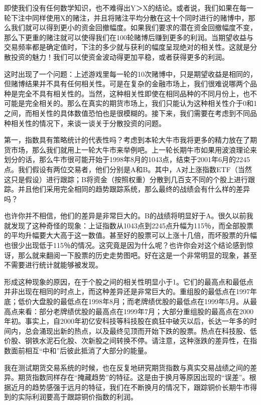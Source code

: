 即使我们没有任何数学知识，也不难得出Y＞X的结论。或者说，我们如果在每一轮下注中同样使用X的赌注，并且将赌注平均分散在这十个同时进行的赌博中，那么我们就可以得到更小的资金回撤幅度。如果我们要求的潜在资金回撤幅度不变，那么下更重的赌注就可以使得我们在100轮赌博后赚到更多的利润。当期望收益与交易频率都是确定值时，下注的多少就与获利的幅度呈现绝对的相关性。这就是分散投资的魅力！我们可以使资金波动得更加平稳，或者获得更多的利润。

这时出现了一个问题：上述游戏里每一轮的10次赌博中，只是期望收益是相同的，但赌博结果并不具有任何相关性。可是在复杂的金融市场上，我们很难说哪两个品种是完全不具有相关性的。当然，这种相关性即使在相同品种的不同月份上，也不可能是完全相关的。那么在真实的期货市场上，我们只能认为这种相关性介于0和1之间，而相关性的具体数值恐怕也是很模糊的。接下来，我们需要在考虑到不同品种相关性的情况下，来谈一谈关于分散投资的问题。

第一，指数具有策略统计的代表性吗？考虑到本轮大牛市我将更多的精力放在了期货市场，那么我们就用上一轮大牛市来举例吧。上一轮长期牛市如果用波浪理论来划分的话，那么牛市很可能开始于1998年8月的1043点，结束于2001年6月的2245点。我们假设有两位交易者，他们分别是A和B。其中，A对上涨指数ETF（当然这只是假设）进行跟踪；B将资金（按照权重）分散到几百支不同的个股上进行跟踪。并且他们采用完全相同的趋势跟踪系统，那么最终的战绩会有什么样的差异吗？

也许你并不相信，他们的差异是非常巨大的。B的战绩将明显好于A。很久以前我就发现了这种奇怪的现象：上证指数从1043点到2245点升幅为115％，而全部股票的平均升幅要大大高于这一数值。甚至好的股票可以上涨十几倍，而坏股票的升幅也很少出现低于115％的情况。这究竟是因为什么呢？也许你会对这个结论感到惊讶，那么就来翻阅一下股票的历史走势图吧。好在这是一个非常明显的现象，甚至不需要进行统计就能够被发现。

形成这种现象的原因，在于个股之间的相关性明显小于1。它们的最高点和最低点并非出现在相同的时点上，而这种差异还是非常巨大的。重组股的最低点在1997年底；低价大盘股的最低点在1998年8月；而老牌绩优股的最低点在1999年5月。从最高点来看：部分老牌绩优股的最高点在1999年7月；大部分重组股的最高点在2000年初。事实上，自2000年初亿安科技等科技股在疯狂中破灭以后，长达一年多的时间内，总会涌现出新的热点，以及最终见顶而开始下跌的股票。热点在科技股、低价股、钢铁水泥石化股、次新股之间转换不停。请注意，这种涨跌的差异性，在指数面前相互“中和”后彼此抵消了大部分的能量。

我在测试期货交易系统的时候，也在反复地研究期货指数与真实交易战绩之间的差异。期货指数同样存在“掩藏趋势”的特征。这是由于换月等原因出现的“误差”。根据近月的趋势感强于远月的特征，我们在不断换月的情况下，跟踪铜价长期牛市得到的实际利润要高于跟踪铜价指数的利润。

